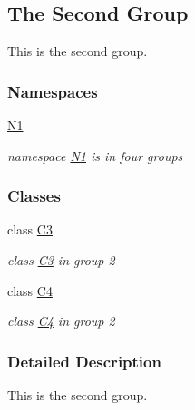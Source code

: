 \hypertarget{group__group2}{}\subsection{The Second Group}
\label{group__group2}


This is the second group.  


\subsubsection*{Namespaces}
\begin{DoxyCompactItemize}
\item 
 \mbox{\hyperlink{namespace_n1}{N1}}
\begin{DoxyCompactList}\small\item\em namespace \mbox{\hyperlink{namespace_n1}{N1}} is in four groups \end{DoxyCompactList}\end{DoxyCompactItemize}
\subsubsection*{Classes}
\begin{DoxyCompactItemize}
\item 
class \mbox{\hyperlink{class_c3}{C3}}
\begin{DoxyCompactList}\small\item\em class \mbox{\hyperlink{class_c3}{C3}} in group 2 \end{DoxyCompactList}\item 
class \mbox{\hyperlink{class_c4}{C4}}
\begin{DoxyCompactList}\small\item\em class \mbox{\hyperlink{class_c4}{C4}} in group 2 \end{DoxyCompactList}\end{DoxyCompactItemize}


\subsubsection{Detailed Description}
This is the second group. 

